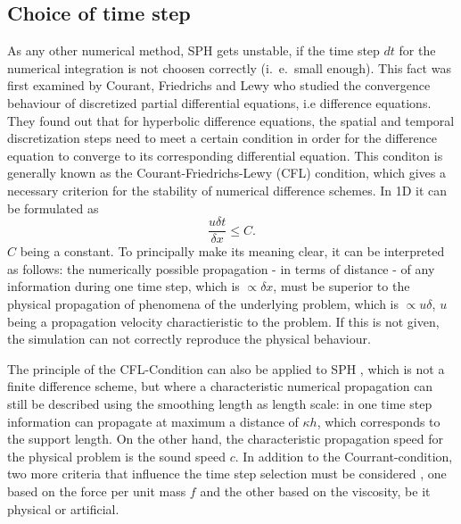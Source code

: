\documentclass{report}
\begin{document}
\subsection{Choice of time step}
\label{sec:TmeStepChoice}
As any other numerical method, SPH gets unstable, if the time step $dt$ for the numerical integration is not choosen correctly (i.\ e.\ small enough). 
This fact was first examined by Courant, Friedrichs and Lewy \cite{Courant1928} who studied the convergence behaviour of discretized partial differential equations, i.e difference equations. They found out that for hyperbolic difference equations, the spatial and temporal discretization steps need to meet a certain condition in order for the difference equation to converge to its  corresponding differential equation. This conditon is generally known as the Courant-Friedrichs-Lewy (CFL) condition, which gives a necessary criterion for the stability of numerical difference schemes.
In 1D it can be formulated as
\begin{equation}
 \frac{u\delta t}{\delta x}\leq C.
\end{equation}
$C$ being a constant.
To principally make its meaning clear, it can be interpreted as follows:
the numerically possible propagation - in terms of distance - of any information during one time step, which is $\propto\delta x$, must be superior to the physical propagation of phenomena of the underlying problem, which is $\propto u\delta$, $u$ being a propagation velocity charactieristic to the problem. If this is not given, the simulation can not correctly reproduce the physical behaviour. 

The principle of the CFL-Condition can also be applied to SPH \cite{Monaghan1989}, which is not a finite difference scheme, but where a characteristic numerical propagation can still be described using the smoothing length as length scale: in one time step information can propagate at maximum a distance of $\kappa h$, which corresponds to the support length. On the other hand, the characteristic propagation speed for the physical problem is the sound speed $c$. 
In addition to the Courrant-condition, two more criteria that influence the time step selection must be considered \cite{Monaghan1992}, one based on the force per unit mass $f$ and the other based on the viscosity, be it physical or artificial.
\end{document}
